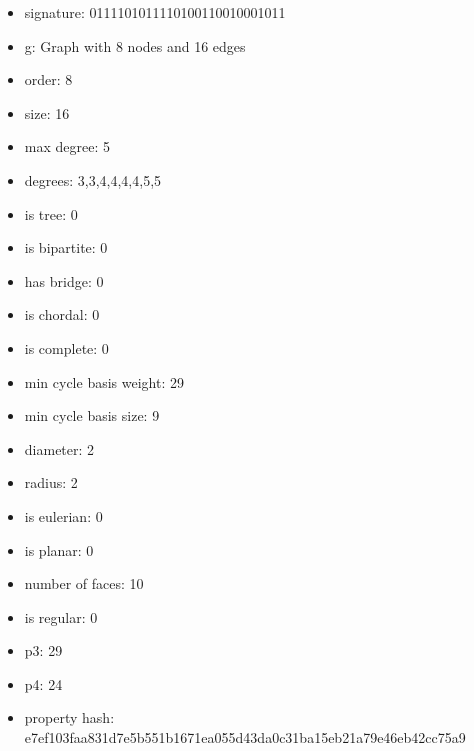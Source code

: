 \begin{itemize}
\item signature: 0111101011110100110010001011
\item g: Graph with 8 nodes and 16 edges
\item order: 8
\item size: 16
\item max degree: 5
\item degrees: 3,3,4,4,4,4,5,5
\item is tree: 0
\item is bipartite: 0
\item has bridge: 0
\item is chordal: 0
\item is complete: 0
\item min cycle basis weight: 29
\item min cycle basis size: 9
\item diameter: 2
\item radius: 2
\item is eulerian: 0
\item is planar: 0
\item number of faces: 10
\item is regular: 0
\item p3: 29
\item p4: 24
\item property hash: e7ef103faa831d7e5b551b1671ea055d43da0c31ba15eb21a79e46eb42cc75a9
\end{itemize}
\newpage
\begin{figure}
\end{figure}
